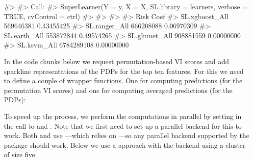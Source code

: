 \begin{Schunk}
\begin{Soutput}
#> 
#> Call:  
#> SuperLearner(Y = y, X = X, SL.library = learners, verbose = TRUE, cvControl = ctrl) 
#> 
#> 
#> 
#>                      Risk       Coef
#> SL.xgboost_All  569646381 0.43455425
#> SL.ranger_All   666208088 0.06970309
#> SL.earth_All    553872844 0.49574265
#> SL.glmnet_All   908881559 0.00000000
#> SL.ksvm_All    6784289108 0.00000000
\end{Soutput}
\end{Schunk}

In the code chunks below we request permutation-based VI scores and add
sparkline representations of the PDPs for the top ten features. For this
we need to define a couple of wrapper functions. One for computing
predictions (for the permutation VI scores) and one for computing
averaged predictions (for the PDPs):

\begin{Schunk}
\end{Schunk}

To speed up the process, we perform the computations in parallel by
setting  in the call to  and
. Note that we first need to set up a parallel
backend for this to work. Both  and  use
 \citep{plyr-pkg}---which relies on 
\citep{foreach-pkg}---so any parallel backend supported by the
 package should work. Below we use a  approach
with the  backend \citep{doParallel-pkg} using a
cluster of size five.

